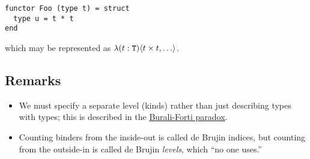 \begin{verbatim}
functor Foo (type t) = struct
  type u = t * t
end
\end{verbatim}
which may be represented as $\lambda (t:\mathtt{T}) \langle t \times t, \ldots \rangle$.

\subsection{Remarks}
\begin{itemize}
  \item We must specify a separate level (kinds) rather than just describing types with types;
    this is described in the
    \href{https://en.wikipedia.org/wiki/Burali-Forti_paradox}{Burali-Forti paradox}.
  \item Counting binders from the inside-out is called de Brujin indices, but counting from
    the outside-in is called de Brujin \emph{levels}, which ``no one uses.''
\end{itemize}
